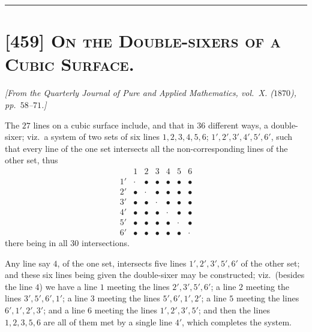 \documentclass[11pt,a4paper]{article}
\begin{document}
\bigskip
\hrule
\bigskip

\section*{[459] \textsc{On the Double-sixers of a Cubic Surface.}}

\begin{center}
\textit{[From the Quarterly Journal of Pure and Applied Mathematics,
vol.\ X. ($1870$), pp.\ $58$--$71$.]}
\end{center}

\medskip

The $27$ lines on a cubic surface include, and that in $36$ different
ways, a double-sixer; viz.\ a system of two sets of six lines
$1, 2, 3, 4, 5, 6$; $1', 2', 3', 4', 5', 6'$, such that every line of the
one set intersects all the non-corresponding lines of the other set, thus
\[
\begin{array}{c|cccccc}
   & 1 & 2 & 3 & 4 & 5 & 6 \\\hline
1' & \cdot & \bullet & \bullet & \bullet & \bullet & \bullet \\
2' & \bullet & \cdot & \bullet & \bullet & \bullet & \bullet \\
3' & \bullet & \bullet & \cdot & \bullet & \bullet & \bullet \\
4' & \bullet & \bullet & \bullet & \cdot & \bullet & \bullet \\
5' & \bullet & \bullet & \bullet & \bullet & \cdot & \bullet \\
6' & \bullet & \bullet & \bullet & \bullet & \bullet & \cdot
\end{array}
\]
there being in all $30$ intersections.

Any line say $4$, of the one set, intersects five lines $1', 2', 3', 5', 6'$
of the other set; and these six lines being given the double-sixer may be
constructed; viz.\ (besides the line $4$) we have a line $1$ meeting the
lines $2', 3', 5', 6'$; a line $2$ meeting the lines $3', 5', 6', 1'$; a
line $3$ meeting the lines $5', 6', 1', 2'$; a line $5$ meeting the lines
$6', 1', 2', 3'$; and a line $6$ meeting the lines $1', 2', 3', 5'$; and
then the lines $1, 2, 3, 5, 6$ are all of them met by a single line $4'$,
which completes the system.
\end{document}
